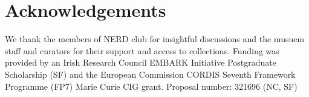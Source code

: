\documentclass[12pt,a4paper]{article}
\begin{document}








\section*{Acknowledgements}

We thank the members of NERD club for insightful discussions and the musuem staff and curators for their support and access to collections. Funding was provided by an Irish Research Council EMBARK Initiative Postgraduate Scholarship (SF) and the European Commission CORDIS Seventh Framework Programme (FP7) Marie Curie CIG grant. Proposal number: 321696 (NC, SF)






\end{document}
